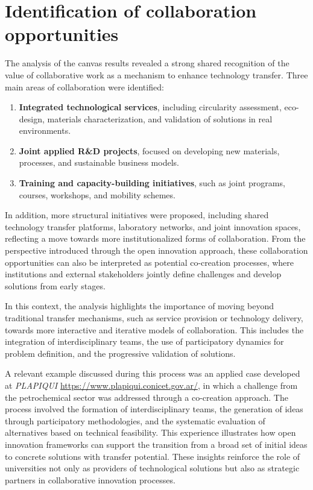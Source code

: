 \documentclass[
  12pt,
  oneside]{book}
\providecommand{\tightlist}{%
  \setlength{\itemsep}{0pt}\setlength{\parskip}{0pt}}
\begin{document}
\newpage

\section{Identification of collaboration
opportunities}\label{identification-of-collaboration-opportunities}

The analysis of the canvas results revealed a strong shared recognition
of the value of collaborative work as a mechanism to enhance technology
transfer. Three main areas of collaboration were identified:

\begin{enumerate}
\def\labelenumi{\arabic{enumi}.}
\tightlist
\item
  \textbf{Integrated technological services}, including circularity
  assessment, eco-design, materials characterization, and validation of
  solutions in real environments.
\item
  \textbf{Joint applied R\&D projects}, focused on developing new
  materials, processes, and sustainable business models.
\item
  \textbf{Training and capacity-building initiatives}, such as joint
  programs, courses, workshops, and mobility schemes.
\end{enumerate}

In addition, more structural initiatives were proposed, including shared
technology transfer platforms, laboratory networks, and joint innovation
spaces, reflecting a move towards more institutionalized forms of
collaboration. From the perspective introduced through the open
innovation approach, these collaboration opportunities can also be
interpreted as potential co-creation processes, where institutions and
external stakeholders jointly define challenges and develop solutions
from early stages.

In this context, the analysis highlights the importance of moving beyond
traditional transfer mechanisms, such as service provision or technology
delivery, towards more interactive and iterative models of
collaboration. This includes the integration of interdisciplinary teams,
the use of participatory dynamics for problem definition, and the
progressive validation of solutions.

A relevant example discussed during this process was an applied case
developed at \emph{PLAPIQUI} \url{https://www.plapiqui.conicet.gov.ar/},
in which a challenge from the petrochemical sector was addressed through
a co-creation approach. The process involved the formation of
interdisciplinary teams, the generation of ideas through participatory
methodologies, and the systematic evaluation of alternatives based on
technical feasibility. This experience illustrates how open innovation
frameworks can support the transition from a broad set of initial ideas
to concrete solutions with transfer potential. These insights reinforce
the role of universities not only as providers of technological
solutions but also as strategic partners in collaborative innovation
processes.
\end{document}
